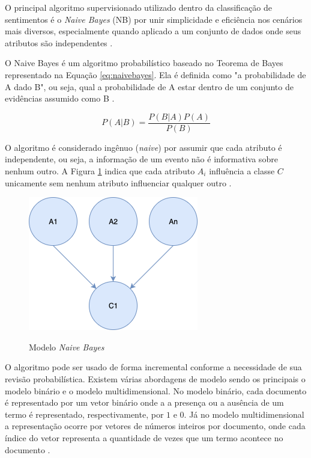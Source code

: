 O principal algoritmo supervisionado utilizado dentro da classificação de sentimentos é o \textit{Naive Bayes} (NB) por unir simplicidade e eficiência nos cenários mais diversos, especialmente quando aplicado a um conjunto de dados onde seus atributos são independentes \cite{VIEGAS2018153}. 

O Naive Bayes é um algoritmo probabilístico baseado no Teorema de Bayes representado na Equação \ref{eq:naivebayes}. Ela é definida como "a probabilidade de A dado B", ou seja, qual a probabilidade de A estar dentro de um conjunto de evidências assumido como B \cite{schmitt2013analise}.

\begin{equation}
    \label{eq:naivebayes}
     P\left ( A| B \right ) = \frac{P\left ( B|A \right )P\left ( A \right )}{P\left ( B \right )}
\end{equation}

O algoritmo é considerado ingênuo (\textit{naive}) por assumir que cada atributo é independente, ou seja, a informação de um evento não é informativa sobre nenhum outro. A Figura \ref{fig:ModeloNaiveBayes}  indica que cada atributo $A_{i}$ influência a classe $C$ unicamente sem nenhum atributo influenciar qualquer outro \cite{schmitt2013analise}.

\begin{figure}[!h]
\centering 
\caption{Modelo \textit{Naive Bayes}}
\includegraphics[scale=0.70]{imagens/modeloNaiveBayes.png}
\label{fig:ModeloNaiveBayes}
\end{figure}

O algoritmo pode ser usado de forma incremental conforme a necessidade de sua revisão probabilística. Existem várias abordagens de modelo sendo os principais o modelo binário e o modelo multidimensional. No modelo binário, cada documento é representado por um vetor binário onde a a presença ou a ausência de um termo é representado, respectivamente, por $1$ e $0$. Já no modelo multidimensional a representação ocorre por vetores de números inteiros por documento, onde  cada índice do vetor representa a quantidade de vezes que um termo acontece no documento \cite{schmitt2013analise}.

